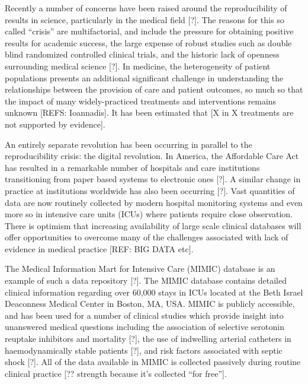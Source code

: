 \documentclass{elsart}
\begin{document}
Recently a number of concerns have been raised around the reproducibility of results in science, particularly in the medical field [?]. The reasons for this so called ``crisis'' are multifactorial, and include the pressure for obtaining positive results for academic success, the large expense of robust studies such as double blind randomized controlled clinical trials, and the historic lack of openness surrounding medical science [?].
In medicine, the heterogeneity of patient populations presents an additional significant challenge in understanding the relationships between the provision of care and patient outcomes, so much so that the impact of many widely-practiced treatments and interventions remains unknown [REFS: Ioannadis]. It has been estimated that [X in X treatments are not supported by evidence].


An entirely separate revolution has been occurring in parallel to the reproducibility crisis: the digital revolution. In America, the Affordable Care Act has resulted in a remarkable number of hospitals and care institutions transitioning from paper based systems to electronic ones [?]. A similar change in practice at institutions worldwide has also been occurring [?]. Vast quantities of data are now routinely collected by modern hospital monitoring systems and even more so in intensive care units (ICUs) where patients require close observation. There is optimism that increasing availability of large scale clinical databases will offer opportunities to overcome many of the challenges associated with lack of evidence in medical practice [REF: BIG DATA etc].



The Medical Information Mart for Intensive Care (MIMIC) database is an example of such a data repository [?]. The MIMIC database contains detailed clinical information regarding over 60,000 stays in ICUs located at the Beth Israel Deaconness Medical Center in Boston, MA, USA. MIMIC is publicly accessible, and has been used for a number of clinical studies which provide insight into unanswered medical questions including the association of selective serotonin reuptake inhibitors and mortality [?], the use of indwelling arterial catheters in haemodynamically stable patients [?], and risk factors associated with septic shock [?]. All of the data available in MIMIC is collected passively during routine clinical practice [?? strength because it's collected ``for free''].
\end{document}
